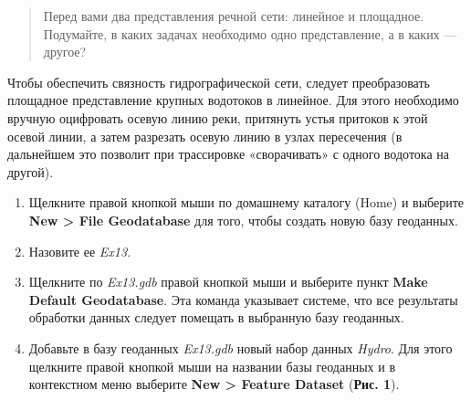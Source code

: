 \documentclass[]{book}
\theoremstyle{definition}
\theoremstyle{definition}
\theoremstyle{definition}
\theoremstyle{remark}
\begin{document}
\begin{quote}
Перед вами два представления речной сети: линейное и площадное.
Подумайте, в каких задачах необходимо одно представление, а в каких ---
другое?
\end{quote}

Чтобы обеспечить связность гидрографической сети, следует преобразовать
площадное представление крупных водотоков в линейное. Для этого
необходимо вручную оцифровать осевую линию реки, притянуть устья
притоков к этой осевой линии, а затем разрезать осевую линию в узлах
пересечения (в дальнейшем это позволит при трассировке «сворачивать» с
одного водотока на другой).

\begin{enumerate}
\def\labelenumi{\arabic{enumi}.}
\item
  Щелкните правой кнопкой мыши по домашнему каталогу (Home) и выберите
  \textbf{New \textgreater{} File Geodatabase} для того, чтобы создать
  новую базу геоданных.
\item
  Назовите ее \emph{Ex13.}
\item
  Щелкните по \emph{Ex13.gdb} правой кнопкой мыши и выберите пункт
  \textbf{Make Default Geodatabase}. Эта команда указывает системе, что
  все результаты обработки данных следует помещать в выбранную базу
  геоданных.
\item
  Добавьте в базу геоданных \emph{Ex13.gdb} новый набор данных
  \emph{Hydro}. Для этого щелкните правой кнопкой мыши на названии базы
  геоданных и в контекстном меню выберите \textbf{New \textgreater{}
  Feature Dataset} (\textbf{Рис. 1}).


\end{enumerate}
\end{document}
